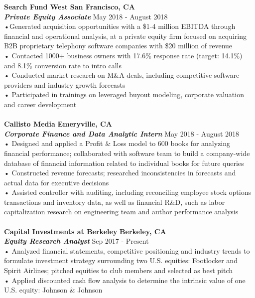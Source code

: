 \documentclass[10.5pt]{article}
\begin{document}
\textbf{Search Fund West} 
\hfill
\textbf{San Francisco, CA}\\
\textbf{\textit{Private Equity Associate}}
\hfill
May 2018 - August 2018\\
•Generated acquisition opportunities with a \$1-4 million EBITDA through financial and operational analysis, at a private equity firm focused on acquiring B2B proprietary telephony software companies with \$20 million of revenue\\
• Contacted 1000+ business owners with 17.6\% response rate (target: 14.1\%) and 8.1\% conversion rate to intro calls\\
• Conducted market research on M\&A deals, including competitive software providers and industry growth forecasts\\
• Participated in trainings on leveraged buyout modeling, corporate valuation and career development
\\~\\
\textbf{Callisto Media} 
\hfill
\textbf{Emeryville, CA}\\
\textbf{\textit{Corporate Finance and Data Analytic Intern}}
\hfill
May 2018 - August 2018\\
• Designed and applied a Profit \& Loss model to 600 books for analyzing financial performance; collaborated with software team to build a company-wide database of financial information related to individual books for future queries\\
• Constructed revenue forecasts; researched inconsistencies in forecasts and actual data for executive decisions\\
• Assisted controller with auditing, including reconciling employee stock options transactions and inventory data, as well as financial R\&D, such as labor capitalization research on engineering team and author performance analysis
\\~\\
\textbf{Capital Investments at Berkeley} 
\hfill
\textbf{Berkeley, CA}\\
\textbf{\textit{Equity Research Analyst}}
\hfill
Sep 2017 - Present\\
• Analyzed financial statements, competitive positioning and industry trends to formulate investment strategy surrounding two U.S. equities: Footlocker and Spirit Airlines; pitched equities to club members and selected as best pitch\\
• Applied discounted cash flow analysis to determine the intrinsic value of one U.S. equity: Johnson \& Johnson\\
\end{document}
